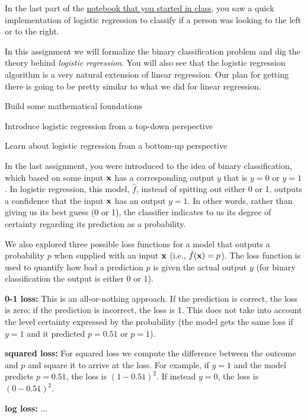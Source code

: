 \documentclass[assignment04_Solutions]{subfiles}
\begin{document}
In the last part of the \href{}{notebook that you started in class}, you saw a quick implementation of logistic regression to classify if a person was looking to the left or to the right. 

In this assignment we will formalize the binary classification problem and dig the theory behind \emph{logistic regression}.  You will also see that the logistic regression algorithm is a very natural extension of linear regression.  Our plan for getting there is going to be pretty similar to what we did for linear regression.
\bi
\item Build some mathematical foundations
\item Introduce logistic regression from a top-down perspective
\item Learn about logistic regression from a bottom-up perspective
\ei



\begin{recall}
In the last assignment, you were introduced to the idea of binary classification, which based on some input $\mathbf{x}$ has a corresponding output $y$ that is $y= 0$ or $y= 1$. In logistic regression, this model, $\hat{f}$, instead of spitting out either 0 or 1, outputs a confidence that the input $\mathbf{x}$ has an output $y= 1$.  In other words, rather than giving us its best guess (0 or 1), the classifier indicates to us its degree of certainty regarding its prediction as a probability.

We also explored three possible loss functions for a model that outputs a probability $p$ when supplied with an input $\mathbf{x}$ (i.e., $\hat{f}(\mathbf{x}) = p$). The loss function is used to quantify how bad a prediction $p$ is given the actual output $y$ (for binary classification the output is either $0$ or $1$).

\be
\item \textbf{0-1 loss:} This is an all-or-nothing approach. If the prediction is correct, the loss is zero; if the prediction is incorrect, the loss is 1. This does not take into account the level certainty expressed by the probability (the model gets the same loss if $y = 1$ and it predicted $p = 0.51$ or $p = 1$).
\item \textbf{squared loss:}  For squared loss we compute the difference between the outcome and $p$ and square it to arrive at the loss.  For example, if $y = 1$ and the model predicts $p = 0.51$, the loss is $(1 - 0.51)^2$.  If instead $y = 0$, the loss is $(0 - 0.51)^2$.
\item \textbf{log loss:} ...
\ee


\end{recall}
\end{document}
